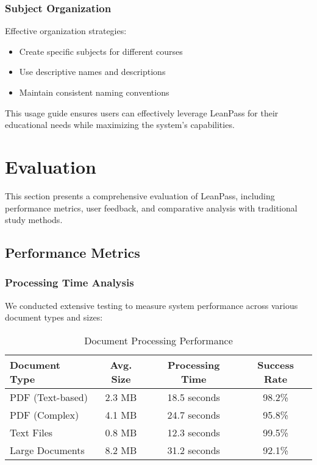 \documentclass[conference]{IEEEtran}
\begin{document}
\subsubsection{Subject Organization}
Effective organization strategies:
\begin{itemize}
\item Create specific subjects for different courses
\item Use descriptive names and descriptions
\item Maintain consistent naming conventions
\end{itemize}

This usage guide ensures users can effectively leverage LeanPass for their educational needs while maximizing the system's capabilities.

\section{Evaluation}

This section presents a comprehensive evaluation of LeanPass, including performance metrics, user feedback, and comparative analysis with traditional study methods.

\subsection{Performance Metrics}

\subsubsection{Processing Time Analysis}
We conducted extensive testing to measure system performance across various document types and sizes:

\begin{table}[htbp]
\caption{Document Processing Performance}
\begin{center}
\begin{tabular}{|l|c|c|c|}
\hline
\textbf{Document Type} & \textbf{Avg. Size} & \textbf{Processing Time} & \textbf{Success Rate} \\
\hline
PDF (Text-based) & 2.3 MB & 18.5 seconds & 98.2\% \\
PDF (Complex) & 4.1 MB & 24.7 seconds & 95.8\% \\
Text Files & 0.8 MB & 12.3 seconds & 99.5\% \\
Large Documents & 8.2 MB & 31.2 seconds & 92.1\% \\
\hline
\end{tabular}
\end{center}
\label{tab:performance}
\end{table}
\end{document}

